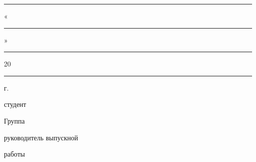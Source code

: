 \documentclass[../thesis.tex]{subfiles}
\begin{document}
\thispagestyle{empty}

\begin{center}

    \noindent\titleboldcaps{\ministry}
    
    \noindent\titleboldcaps{\universityone}\linebreak
    \noindent\titleboldcaps{\universitytwo}\linebreak
    \noindent\titleboldcaps{\universitythree}

\bigskip

    \noindent\titlebig{\faculty}
    
    \noindent\titlebig{\department}

\bigskip

    \null\hfill
    \begin{minipage}{0.5\textwidth}
        
        \begin{flushright}
        \departmentdirector
        
        \rule{3cm}{0.4pt} \departmentdirectorshortname
        
        «\rule{1cm}{0.4pt}» \rule{3cm}{0.4pt} 20\rule{0.5cm}{0.4pt} г.
        \end{flushright}
    \end{minipage}

\bigskip\bigskip\bigskip\bigskip

    \noindent\titlemain{\thesis}

\bigskip

    \noindent\specialization
    
    \noindent\major

\bigskip
    
     \thesisname
    
     студент \myfullname

\bigskip

    \begin{flushleft}
    Группа \groupnum
    \end{flushleft}

\bigskip

    \null\hfill
    \begin{minipage}{0.5\textwidth}
        \begin{center}
             руководитель выпускной
            
             работы
            

\end{center}
\end{minipage}
\end{center}
\end{document}
